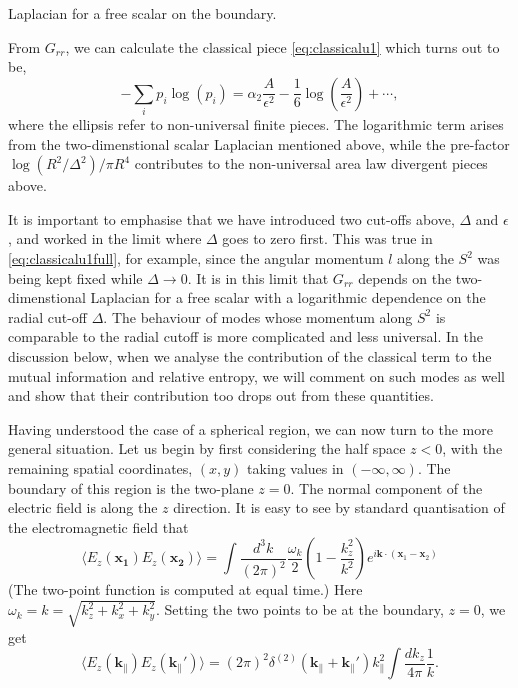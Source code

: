 Laplacian for a free scalar on the boundary. 
\par From $G_{rr}$, we can calculate the classical piece \eqref{eq:classicalu1}
which turns out to be,
\begin{equation}
  -\sum_i p_i\log(p_i) = \alpha_2\frac{A}{\epsilon^2}
  - \frac{1}{6}\log\left(\frac{A}{\epsilon^2}\right) + \cdots,
  \label{eq:classicalu1full}
\end{equation}
where the ellipsis refer to non-universal finite pieces. The logarithmic term
arises from the two-dimenstional scalar Laplacian mentioned above, while
the pre-factor $\log(R^2/\Delta^2)/\pi R^4$ contributes to the non-universal
area law divergent pieces above.
\par It is important to emphasise that we have introduced two cut-offs above,
$\Delta$ and $\epsilon$, and worked in the limit where $\Delta$ goes to zero
first. This was true in \eqref{eq:classicalu1full}, for example, since the
angular momentum $l$ along the $S^2$ was being kept fixed while
$\Delta\rightarrow 0$. It is in this limit that $G_{rr}$ depends on the
two-dimenstional Laplacian for a free scalar with a logarithmic dependence on
the radial cut-off $\Delta$. The behaviour of modes whose momentum along $S^2$
is comparable to the radial cutoff is more complicated and less universal. In
the discussion below, when we analyse the contribution of the classical term to
the mutual information and relative entropy, we will comment on such modes as
well and show that their contribution too drops out from these quantities.
\par Having understood the case of a spherical region, we can now turn to the 
more general situation. Let us begin by first considering the half space $z<0$,
with the remaining spatial coordinates, $(x,y)$ taking values in
$(-\infty,\infty)$. The boundary of this region is the two-plane $z=0$. The
normal component of the electric field is along the $z$ direction. It is easy
to see by standard quantisation of the electromagnetic field that 
\begin{equation}
  \langle E_z(\mathbf{x_1})E_z(\mathbf{x_2})\rangle = \int
  \frac{d^3k}{(2\pi)^2}\frac{\omega_k}{2}\left(1-\frac{k_z^2}{k^2}\right)e^{i\mathbf{k}\cdot(\mathbf{x}_1
    - \mathbf{x}_2)}
    \label{eq:generaltwopoint}
\end{equation}
(The two-point function is computed at equal time.) Here $\omega_k
= k = \sqrt{k^2_z + k^2_x + k^2_y}$. Setting the two points to be at the
boundary, $z=0$, we get
\begin{equation}
  \langle E_z(\mathbf{k}_{\|})E_z(\mathbf{k}_{\|}')\rangle
  = (2\pi)^2\delta^{(2)}(\mathbf{k}_{\|}
  + \mathbf{k}_{\|}')k^2_{\|}\int{\frac{dk_z}{4\pi}\frac{1}{k}}.
\end{equation}
